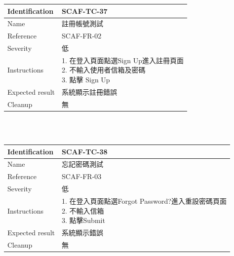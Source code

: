 \documentclass{report}
\begin{document}
\begin{tabularx}{\textwidth}{
  |p{}%
  |p{}|%
  }
  \hline
  \centering Identification &  SCAF-TC-37 \\
  \hline
  \centering Name & 註冊帳號測試 \\
  \hline
  \centering Reference & SCAF-FR-02 \\
  \hline
  \centering Severity & 低 \\
  \hline
  \centering Instructions & 
  \makecell[l]{
    1. 在登入頁面點選Sign Up進入註冊頁面 \\
    2. 不輸入使用者信箱及密碼  \\
    3. 點擊 Sign Up
  }\\
  \hline
  \centering Expected result & 系統顯示註冊錯誤 \\
  \hline
  \centering Cleanup & 無 \\
  \hline
\end{tabularx}
\\
\newline
\\
\begin{tabularx}{\textwidth}{
  |p{}%
  |p{}|%
  }
  \hline
  \centering Identification &  SCAF-TC-38 \\
  \hline
  \centering Name & 忘記密碼測試 \\
  \hline
  \centering Reference & SCAF-FR-03 \\
  \hline
  \centering Severity & 低 \\
  \hline
  \centering Instructions & 
  \makecell[l]{
    1. 在登入頁面點選Forgot Password?進入重設密碼頁面 \\
    2. 不輸入信箱  \\
    3. 點擊Submit \\
  }\\
  \hline
  \centering Expected result & 系統顯示錯誤 \\
  \hline
  \centering Cleanup & 無 \\
  \hline
\end{tabularx}
\\
\newline
\\
\end{document}
